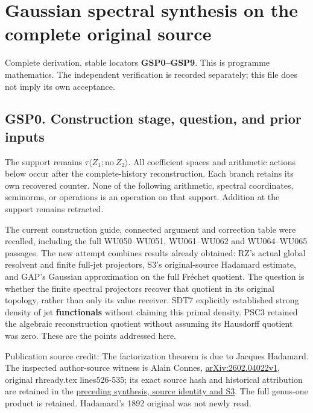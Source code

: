 \section{Gaussian spectral synthesis on the complete original
source}\label{gaussian-spectral-synthesis-on-the-complete-original-source}

Complete derivation, stable locators \textbf{GSP0--GSP9}. This is
programme mathematics. The independent verification is recorded
separately; this file does not imply its own acceptance.

\subsection{GSP0. Construction stage, question, and prior
inputs}\label{gsp0.-construction-stage-question-and-prior-inputs}

The support remains \(\tau\langle Z_1;\mathrm{no}\ Z_2\rangle\). All
coefficient spaces and arithmetic actions below occur after the
complete-history reconstruction. Each branch retains its own recovered
counter. None of the following arithmetic, spectral coordinates,
seminorms, or operations is an operation on that support. Addition at
the support remains retracted.

The current construction guide, connected argument and correction table
were recalled, including the full WU050--WU051, WU061--WU062 and
WU064--WU065 passages. The new attempt combines results already
obtained: RZ's actual global resolvent and finite full-jet projectors,
S3's original-source Hadamard estimate, and GAP's Gaussian approximation
on the full Fréchet quotient. The question is whether the finite
spectral projectors recover that quotient in its original topology,
rather than only its value receiver. SDT7 explicitly established strong
density of jet \textbf{functionals} without claiming this primal
density. PSC3 retained the algebraic reconstruction quotient without
assuming its Hausdorff quotient was zero. These are the points addressed
here.

Publication source credit: The factorization theorem is due to Jacques
Hadamard. The inspected author-source witness is Alain Connes,
\href{https://arxiv.org/abs/2602.04022v1}{arXiv:2602.04022v1}, original
rhready.tex lines526-535; its exact source hash and historical
attribution are retained in the
\href{https://github.com/KokunoYumeto/zeta-function-research-reader/blob/36a82ecca98addb8a98b48204e349737856c7223/workbenches/splitzero-tandem/continuations/20260924-cohomology-weight-and-character-lifts/gct-weight-control/proofs/GLOBAL_MELLIN_SYNTHESIS.md}{preceding
synthesis, source identity and S3}. The full genus-one product is
retained. Hadamard's 1892 original was not newly read.

